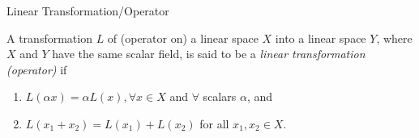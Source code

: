 \begin{flashcard}[Definition]{Linear Transformation/Operator}

  A transformation $L$ of (operator on) a linear space $X$ into a linear
  space $Y$, where $X$ and $Y$ have the same scalar field, is said to be
  a \emph{linear transformation (operator)} if

  \medskip

  \begin{enumerate}
    \item $L(\alpha x) = \alpha L(x), \forall x\in X$ and $\forall$
          scalars $\alpha$, and
    \item $L(x_1 + x_2) = L(x_1) + L(x_2)$ for all $x_1,x_2 \in X$.
  \end{enumerate}

\end{flashcard}